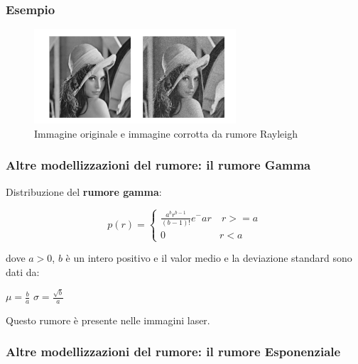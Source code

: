 \subsubsection{Esempio}

\begin{figure}[H]
    \centering
    \includegraphics[width=\linewidth, keepaspectratio]{capitoli/immagini/imgs/esempio-rumore.png}
    \caption*{Immagine originale e immagine corrotta da rumore Rayleigh}
\end{figure}

\subsubsection{Altre modellizzazioni del rumore: il rumore Gamma}

Distribuzione del \textbf{rumore gamma}:

\begin{center}
    $$
        p(r) = \left\{ \begin{array}{cl}
            \frac{a^b r^{b-1}}{(b-1)!}e^-{ar} & \ r >= a \\
            0                                 & r<a
        \end{array} \right.
    $$
\end{center}

dove $a > 0$, $b$ è un intero positivo e il valor medio e la deviazione standard sono dati da:

\begin{center}
    $\mu=\frac{b}{a}$ $\sigma=\frac{\sqrt{b}}{a}$
\end{center}

Questo rumore è presente nelle immagini laser.

\subsubsection{Altre modellizzazioni del rumore: il rumore Esponenziale}

